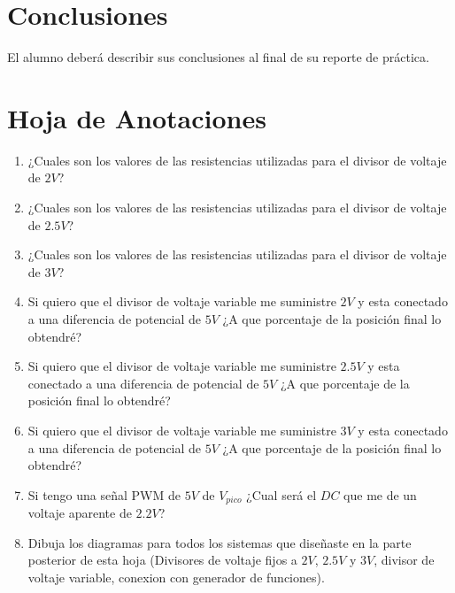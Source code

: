 \section{Conclusiones}

	El alumno deberá describir sus conclusiones al final de su reporte de práctica.
    

\clearpage
\section{Hoja de Anotaciones}
	
	\begin{enumerate}
		\item ¿Cuales son los valores de las resistencias utilizadas para el divisor de voltaje de $2 V$? \newline
		\item ¿Cuales son los valores de las resistencias utilizadas para el divisor de voltaje de $2.5 V$? \newline
		\item ¿Cuales son los valores de las resistencias utilizadas para el divisor de voltaje de $3 V$? \newline
		\item Si quiero que el divisor de voltaje variable me suministre $2 V$ y esta conectado a una diferencia de potencial de $5 V$ ¿A que porcentaje de la posición final lo obtendré? \newline
		\item Si quiero que el divisor de voltaje variable me suministre $2.5 V$ y esta conectado a una diferencia de potencial de $5 V$ ¿A que porcentaje de la posición final lo obtendré? \newline
		\item Si quiero que el divisor de voltaje variable me suministre $3 V$ y esta conectado a una diferencia de potencial de $5 V$ ¿A que porcentaje de la posición final lo obtendré? \newline
		\item Si tengo una señal PWM de $5 V$ de $V_{pico}$ ¿Cual será el $DC$ que me de un voltaje aparente de $2.2 V$?\newline
		\item Dibuja los diagramas para todos los sistemas que diseñaste en la parte posterior de esta hoja (Divisores de voltaje fijos a $2 V$, $2.5 V$ y $3 V$, divisor de voltaje variable, conexion con generador de funciones). \newline \newline \newline \newline \newline
	\end{enumerate}

